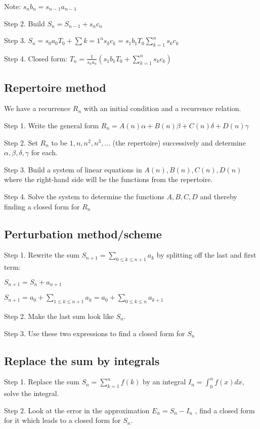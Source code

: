 \documentclass[10pt]{article}
\begin{document}
\begin{multicols}{3}
{Note: $s_n b_n = s_{n-1}a_{n-1}$

Step 2. Build $S_n = S_{n-1} + s_n c_n$

Step 3. $S_n = s_0 a_0 T_0 + \sum{k=1}^n s_k c_k = s_1b_1T_0 \sum_{k=1}^n s_k c_k$

Step 4. Closed form: $T_n = \frac{1}{s_n a_n}\left(s_1b_1T_0 + \sum_{k=1}^n s_k c_k\right)$
}

\subsection{Repertoire method}
{\everymath{\displaystyle}
We have a recurrence $R_n$ with an initial condition and a recurrence relation.

Step 1. Write the general form $R_n = A(n)\alpha + B(n) \beta + C(n) \delta + D(n) \gamma$

Step 2. Set $R_n$ to be $1,n,n^2,n^3,\dots$ (the repertoire) successively and determine $\alpha,\beta,\delta,\gamma$ for each.

Step 3. Build a system of linear equations in $A(n),B(n),C(n),D(n)$ where the right-hand side will be the functions from the repertoire. 

Step 4. Solve the system to determine the functions $A,B,C,D$ and thereby finding a closed form for $R_n$

}

\subsection{Perturbation method/scheme}
{\everymath{\displaystyle}

Step 1. Rewrite the sum $S_{n+1} = \sum_{0\leq k \leq n+1} a_k $ by splitting off the last and first term:

$S_{n+1} = S_n + a_{n+1}$

$S_{n+1} = a_0 + \sum_{1\leq k \leq n+1} a_k = a_0 + \sum_{0\leq k \leq n} a_{k+1}$

Step 2. Make the last sum look like $S_n$.

Step 3. Use these two expressions to find a closed form for $S_n$

}

\subsection{Replace the sum by integrals}
{\everymath{\displaystyle}

Step 1. Replace the sum $S_n=\sum_{k=1}^n f(k)$ by an integral $I_n=\int_{0}^n f(x) dx$, solve the integral.

Step 2. Look at the error in the approximation $E_n = S_n - I_n$ , find a closed form for it which leads to a closed form for $S_n$. 
}

\newpage

\end{multicols}
\end{document}
